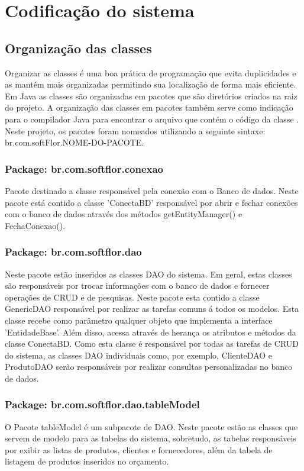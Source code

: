 \section{Codificação do sistema}

    \subsection{Organização das classes}
        Organizar as classes é uma boa prática de programação que  evita duplicidades e as mantém mais organizadas permitindo sua localização de forma mais eficiente. 
        Em Java as classes são organizadas em pacotes que são diretórios criados na raiz do projeto.  
        A organização das classes em pacotes também serve como indicação para o compilador Java para encontrar o arquivo que contém o código da classe \cite{ricarte2001programaccao}. 
        Neste projeto, os pacotes foram nomeados utilizando a seguinte sintaxe: br.com.softFlor.NOME-DO-PACOTE.

    
    \subsubsection{Package: br.com.softflor.conexao}
        Pacote destinado a classe responsável pela conexão com o Banco de dados. Neste pacote está contido a classe 'ConectaBD' responsável por abrir e fechar conexões com o banco de dados através dos métodos getEntityManager() e FechaConexao().
        
    \subsubsection{Package: br.com.softflor.dao}
    Neste pacote estão inseridos as classes DAO do sistema. Em geral, estas classes são responsáveis por trocar informações com o banco de dados e fornecer operações de CRUD e de pesquisas. 
    Neste pacote esta contido a classe GenericDAO responsável por realizar as tarefas comuns á todos os modelos. Esta classe recebe como parâmetro qualquer objeto que implementa a interface 'EntidadeBase'. Além disso, acessa através de herança os atributos e métodos da classe ConectaBD.
    Como esta classe é responsável por todas as tarefas de CRUD do sistema, as classes DAO individuais como, por exemplo, ClienteDAO e ProdutoDAO serão responsáveis por realizar consultas personalizadas no banco de dados.
     
    \subsubsection{Package: br.com.softflor.dao.tableModel}
        O Pacote tableModel é um subpacote de DAO. Neste pacote estão as classes que servem de modelo para as tabelas do sistema, sobretudo, as tabelas responsáveis por exibir as listas de produtos, clientes e fornecedores, além da tabela de listagem de produtos inseridos no orçamento.
        
